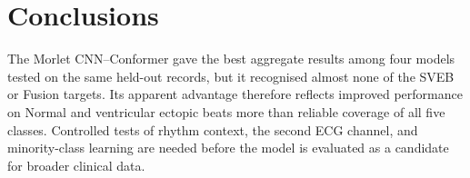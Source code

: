 \section{Conclusions}
The Morlet CNN--Conformer gave the best aggregate results among four models tested on the same held-out records, but it recognised almost none of the SVEB or Fusion targets. Its apparent advantage therefore reflects improved performance on Normal and ventricular ectopic beats more than reliable coverage of all five classes. Controlled tests of rhythm context, the second ECG channel, and minority-class learning are needed before the model is evaluated as a candidate for broader clinical data.
